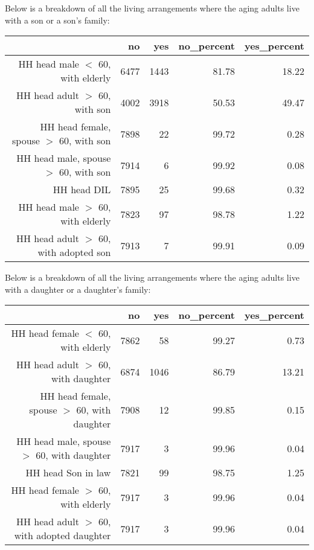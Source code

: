 \documentclass[11pt]{article}
\begin{document}
Below is a breakdown of all the living arrangements where the aging adults live with a son or a son's family:\\
\begin{table}[ht]
\centering
\begin{tabular}{rrrrr}
  \hline
 & no & yes & no\_percent & yes\_percent \\ 
  \hline
HH head male $<$ 60, with elderly & 6477 & 1443 & 81.78 & 18.22 \\ 
  HH head adult $>$ 60, with son & 4002 & 3918 & 50.53 & 49.47 \\ 
  HH head female, spouse $>$ 60, with son & 7898 & 22 & 99.72 & 0.28 \\ 
  HH head male, spouse $>$ 60, with son & 7914 & 6 & 99.92 & 0.08 \\ 
  HH head DIL & 7895 & 25 & 99.68 & 0.32 \\ 
  HH head male $>$ 60, with elderly & 7823 & 97 & 98.78 & 1.22 \\ 
  HH head adult $>$ 60, with adopted son & 7913 & 7 & 99.91 & 0.09 \\ 
   \hline
\end{tabular}
\end{table}\newline
Below is a breakdown of all the living arrangements where the aging adults live with a daughter or a daughter's family:\\
\begin{table}[H]
\centering
\begin{tabular}{rrrrr}
  \hline
 & no & yes & no\_percent & yes\_percent \\ 
  \hline
HH head female $<$ 60, with elderly & 7862 & 58 & 99.27 & 0.73 \\ 
  HH head adult $>$ 60, with daughter & 6874 & 1046 & 86.79 & 13.21 \\ 
  HH head female, spouse $>$ 60, with daughter & 7908 & 12 & 99.85 & 0.15 \\ 
  HH head male, spouse $>$ 60, with daughter & 7917 & 3 & 99.96 & 0.04 \\ 
  HH head Son in law & 7821 & 99 & 98.75 & 1.25 \\ 
  HH head female $>$ 60, with elderly & 7917 & 3 & 99.96 & 0.04 \\ 
  HH head adult $>$ 60, with adopted daughter & 7917 & 3 & 99.96 & 0.04 \\ 
   \hline
\end{tabular}
\end{table}\newline
\end{document}
